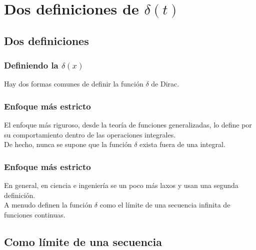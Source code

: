 \documentclass[12pt]{beamer}
\begin{document}
\section{Dos definiciones de \texorpdfstring{$\delta (t)$}{d(t)}}
\subsection{Dos definiciones}

\begin{frame}
\frametitle{Definiendo la $\delta (x)$}
Hay dos formas comunes de definir la función $\delta$ de Dirac.
\end{frame}
\begin{frame}
\frametitle{Enfoque más estricto}
El enfoque más riguroso, desde la teoría de funciones generalizadas, lo define por su comportamiento dentro de las operaciones integrales.
\\
\bigskip
\pause
De hecho, nunca se supone que la función $\delta$ exista fuera de una integral.
\end{frame}
\begin{frame}
\frametitle{Enfoque más estricto}
En general, en ciencia e ingeniería se un poco más laxos y usan una segunda definición.
\\
\bigskip
\pause
A menudo definen la función $\delta$ como el límite de una secuencia infinita de funciones continuas.
\end{frame}

\subsection{Como límite de una secuencia}
\end{document}
